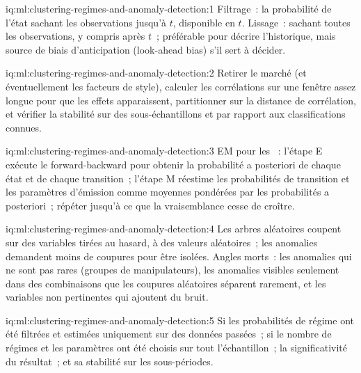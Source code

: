 \begin{solution}{iq:ml:clustering-regimes-and-anomaly-detection:1}
Filtrage~: la probabilité de l'état sachant les observations jusqu'à $t$, disponible en $t$. Lissage~: sachant toutes les observations, y compris
après $t$~; préférable pour décrire l'historique, mais source de biais d'anticipation (look-ahead bias) s'il sert à décider.
\end{solution}

\begin{solution}{iq:ml:clustering-regimes-and-anomaly-detection:2}
Retirer le marché (et éventuellement les facteurs de style), calculer les corrélations sur une fenêtre assez longue pour que les effets apparaissent, partitionner sur la
distance de corrélation, et vérifier la stabilité sur des sous-échantillons et par rapport aux classifications connues.
\end{solution}

\begin{solution}{iq:ml:clustering-regimes-and-anomaly-detection:3}
EM pour les ~: l'étape E exécute le forward-backward pour obtenir la probabilité a posteriori de chaque état et de chaque transition~; l'étape M
réestime les probabilités de transition et les paramètres d'émission comme moyennes pondérées par les probabilités a posteriori~; répéter jusqu'à ce que la vraisemblance cesse
de croître.
\end{solution}

\begin{solution}{iq:ml:clustering-regimes-and-anomaly-detection:4}
Les arbres aléatoires coupent sur des variables tirées au hasard, à des valeurs aléatoires~; les anomalies demandent moins de coupures pour être isolées. Angles morts~: les anomalies qui
ne sont pas rares (groupes de manipulateurs), les anomalies visibles seulement dans des combinaisons que les coupures aléatoires séparent rarement, et
les variables non pertinentes qui ajoutent du bruit.
\end{solution}

\begin{solution}{iq:ml:clustering-regimes-and-anomaly-detection:5}
Si les probabilités de régime ont été filtrées et estimées uniquement sur des données passées~; si le nombre de régimes et les paramètres ont été
choisis sur tout l'échantillon~; la significativité du résultat~; et sa stabilité sur les sous-périodes.
\end{solution}

